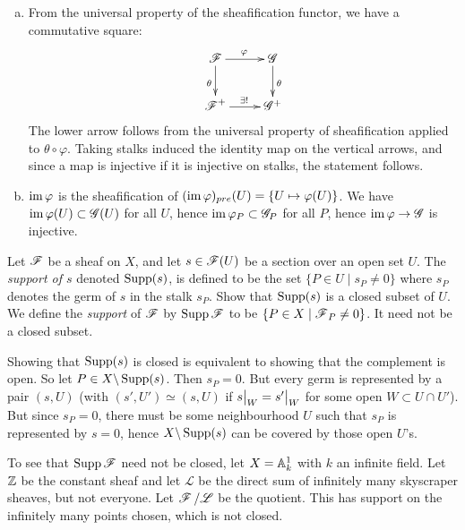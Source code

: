 \documentclass[11pt, english]{article}
\begin{document}
  \begin{sol}
    \begin{enumerate}[a)]
    \item From the universal property of the sheafification functor, we have a commutative square:
\[
\xymatrix{
\FF \ar[r]^\varphi \ar[d]_\theta & \mathscr G \ar[d]^\theta \\
\FF^+ \ar[r]^{\exists !} & \mathscr G^+
}
\]
The lower arrow follows from the universal property of sheafification applied to $\theta \circ \varphi$. Taking stalks induced the identity map on the vertical arrows, and since a map is injective if it is injective on stalks, the statement follows.
\item $\operatorname{im} \varphi$ is the sheafification of $(\operatorname{im} \varphi)_{pre}(U)=\{U \mapsto \varphi(U)\} $.  We have $\operatorname{im} \varphi(U) \subset \mathscr G(U)$ for all $U$, hence $\operatorname{im} \varphi_P \subset \mathscr G_P$ for all $P$, hence $\operatorname{im} \varphi \to \mathscr G$ is injective.
    \end{enumerate}
  \end{sol}

\begin{exc}
Let $\operatorname{\mathscr{F}}$ be a sheaf on $X$, and let $s \in \operatorname{\mathscr{F}}(U)$ be a section over an open set $U$. The \emph{support of $s$} denoted $\operatorname{Supp} (s)$, is defined to be the set $\{ P \in U \mid s_P \neq 0\}$ where $s_P$ denotes the germ of $s$ in the stalk $s_P$. Show that $\operatorname{Supp} (s)$ is a closed subset of $U$. We define the \emph{support} of $\operatorname{\mathscr{F}}$ by $\operatorname{Supp} \operatorname{\mathscr{F}}$ to be $\{P \in X \mid \operatorname{\mathscr{F}}_P \neq 0 \}$. It need not be a closed subset.
\end{exc}

\begin{sol}
Showing that $\operatorname{Supp}(s)$ is closed is equivalent to showing that the complement is open. So let $P \in X \backslash \operatorname{Supp}(s)$. Then $s_P=0$. But every germ is represented by a pair $(s,U)$ (with $(s',U') \simeq (s,U)$ if $\restr{s}{W}=\restr{s'}{W}$ for some open $W \subset U \cap U'$). But since $s_P=0$, there must be some neighbourhood $U$ such that $s_P$ is represented by $s=0$, hence $X \backslash \operatorname{Supp}(s)$ can be covered by those open $U$'s.

To see that $\operatorname{Supp} \operatorname{\mathscr{F}}$ need not be closed, let $X=\mathbb{A}_k^1$ with $k$ an infinite field. Let $\mathbb{Z}$ be the constant sheaf and let $\mathscr L$ be the direct sum of infinitely many skyscraper sheaves, but not everyone. Let $\operatorname{\mathscr{F}}/\mathscr L$ be the quotient. This has support on the infinitely many points chosen, which is not closed.
\end{sol}
\end{document}
